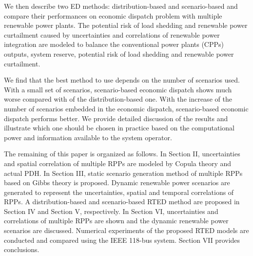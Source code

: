 We then describe two ED methods: distribution-based and scenario-based and compare their performances on economic dispatch problem with multiple renewable power plants. The potential risk of load shedding and renewable power curtailment caused by uncertainties and correlations of renewable power integration are modeled to balance the conventional power plants (CPPs) outputs, system reserve, potential risk of load shedding and renewable power curtailment.

We find that the best method to use depends on the number of scenarios used. With a small set of scenarios, scenario-based economic dispatch shows much worse compared with of the distribution-based one. With the increase of the number of scenarios embedded in the economic dispatch, scenario-based economic dispatch performs better. We provide detailed discussion of the results and illustrate which one should be chosen in practice based on the computational power and information available to the system operator. 

The remaining of this paper is organized as follows. In Section II, uncertainties and spatial correlation of multiple RPPs are modeled by Copula theory and actual PDH. In Section III, static scenario generation method of multiple RPPs based on Gibbs theory is proposed. Dynamic renewable power scenarios are generated to represent the uncertainties, spatial and temporal correlations of RPPs. A distribution-based and scenario-based RTED method are proposed in Section IV and Section V, respectively. In Section VI, uncertainties and correlations of multiple RPPs are shown and the dynamic renewable power scenarios are discussed. Numerical experiments of the proposed RTED models are conducted and compared using the IEEE 118-bus system. Section VII provides conclusions.
